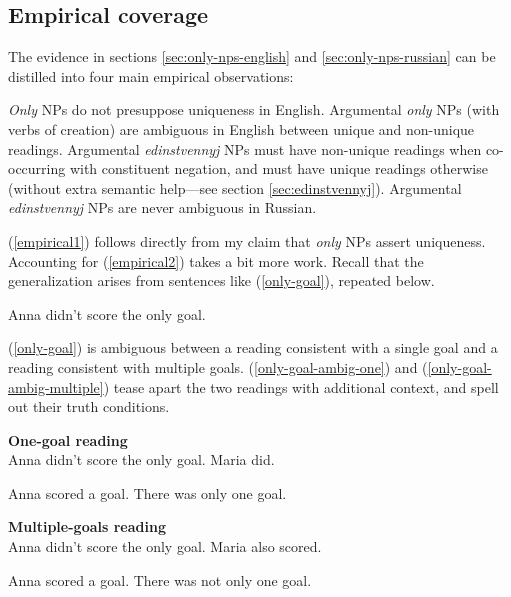 \subsection{Empirical coverage}
The evidence in sections \ref{sec:only-nps-english} and \ref{sec:only-nps-russian} can be distilled into four main empirical observations:

\begin{exe}
	\ex \label{empirical1} \textit{Only} NPs do not presuppose uniqueness in English.
	\ex \label{empirical2} Argumental \textit{only} NPs (with verbs of creation) are ambiguous in English between unique and non-unique readings.
	\ex \label{empirical3} Argumental \textit{edinstvennyj} NPs must have non-unique readings when co-occurring with constituent negation, and must have unique readings otherwise (without extra semantic help---see section \ref{sec:edinstvennyj}).
	\ex \label{empirical4} Argumental \textit{edinstvennyj} NPs are never ambiguous in Russian.
\end{exe}

(\ref{empirical1}) follows directly from my claim that \textit{only} NPs assert uniqueness. Accounting for (\ref{empirical2}) takes a bit more work. Recall that the generalization arises from sentences like (\ref{only-goal}), repeated below.

\begin{exe}
	 Anna didn't score the only goal.
\end{exe}

(\ref{only-goal}) is ambiguous between a reading consistent with a single goal and a reading consistent with multiple goals. (\ref{only-goal-ambig-one}) and (\ref{only-goal-ambig-multiple}) tease apart the two readings with additional context, and spell out their truth conditions.

\begin{exe}
	\ex \label{only-goal-ambig-one} \textbf{One-goal reading} \\ Anna didn't score the only goal. Maria did.
	\begin{xlist}
		\ex Anna scored a goal.
		\ex There was only one goal.
	\end{xlist}

	\ex \label{only-goal-ambig-multiple} \textbf{Multiple-goals reading} \\ Anna didn't score the only goal. Maria also scored.
	\begin{xlist}
		\ex Anna scored a goal.
		\ex There was not only one goal.
	\end{xlist}
\end{exe}

